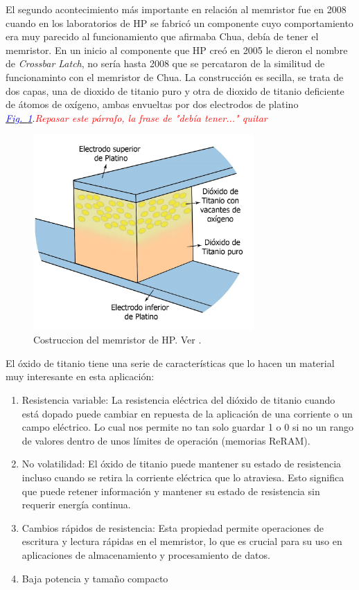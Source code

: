 \documentclass[12pt,a4paper]{report} %
\newcommand{\fref}[1]{\hyperref[#1]{\textcolor{blue}{\textit{Fig.~\ref*{#1}}}}}
\begin{document}
	
	
	\newpage
	
	\noindent El segundo acontecimiento más importante en relación al memristor fue en 2008 cuando en los laboratorios de HP se fabricó un componente cuyo comportamiento era muy parecido al funcionamiento que afirmaba Chua, debía de tener el memristor. En un inicio al componente que HP creó en 2005 le dieron el nombre de \textit{Crossbar Latch}, no sería hasta 2008 que se percataron de la similitud de funcionaminto con el memristor de Chua. La construcción es secilla, se trata de dos capas, una de dioxido de titanio puro y otra de dioxido de titanio deficiente de átomos de oxígeno, ambas envueltas por dos electrodos de platino \fref{fig:mem1}.\textit{\textcolor{red}{Repasar este párrafo, la frase de "debía tener..." quitar}}
	
	\begin{figure}[h]
		\centering
		\includegraphics[width=0.75\textwidth]{mem1.jpg}
		\caption{Costruccion del memristor de HP. Ver \cite{williams}.}
		\label{fig:mem1}
	\end{figure}
	
	El óxido de titanio tiene una serie de características que lo hacen un material muy interesante en esta aplicación:
	\begin{enumerate}
		\item Resistencia variable: La resistencia eléctrica del dióxido de titanio cuando está dopado puede cambiar en repuesta de la aplicación de una corriente o un campo eléctrico. Lo cual nos permite no tan solo guardar 1 o 0 si no un rango de valores dentro de unos límites de operación (memorias ReRAM).
		\item No volatilidad: El óxido de titanio puede mantener su estado de resistencia incluso cuando se retira la corriente eléctrica que lo atraviesa. Esto significa que puede retener información y mantener su estado de resistencia sin requerir energía continua.
		\item Cambios rápidos de resistencia:  Esta propiedad permite operaciones de escritura y lectura rápidas en el memristor, lo que es crucial para su uso en aplicaciones de almacenamiento y procesamiento de datos.
		\item Baja potencia y tamaño compacto
	\end{enumerate}
	\newpage
	
\end{document}
